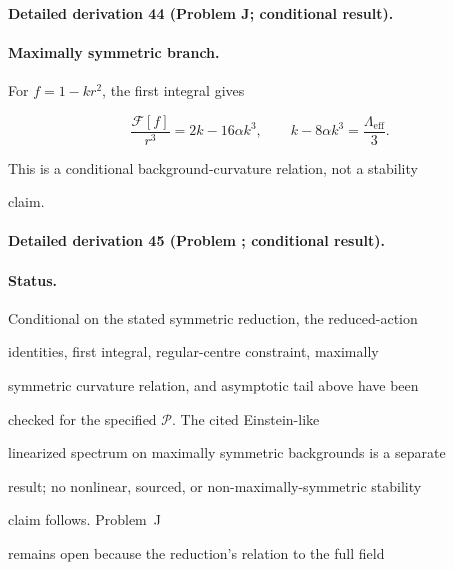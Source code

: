 \label{sec:status-J}



\paragraph{Detailed derivation 44 (Problem J; conditional result).} \label{ref:detail-43} %



\paragraph{Maximally symmetric branch.}

For \(f=1-kr^2\), the first integral gives

\[

\frac{\mathcal F[f]}{r^3}=2k-16\alpha k^3,\qquad

k-8\alpha k^3=\frac{\Lambda_{\mathrm{eff}}}{3}.

\]

This is a conditional background-curvature relation, not a stability

claim.



\paragraph{Detailed derivation 45 (Problem ; conditional result).} \label{ref:detail-44} %



\paragraph{Status.}

Conditional on the stated symmetric reduction, the reduced-action

identities, first integral, regular-centre constraint, maximally

symmetric curvature relation, and asymptotic tail above have been

checked for the specified \(\mathcal P\). The cited Einstein-like

linearized spectrum on maximally symmetric backgrounds is a separate

result; no nonlinear, sourced, or non-maximally-symmetric stability

claim follows. Problem~J

remains open because the reduction's relation to the full field

